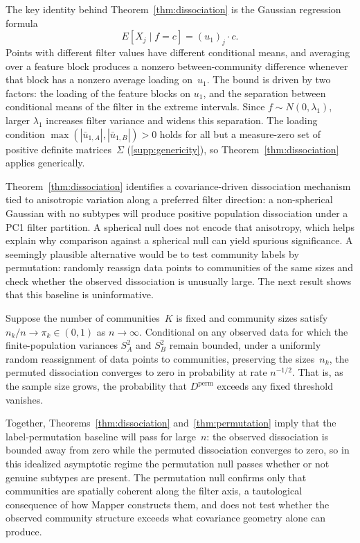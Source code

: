 \documentclass[hidelinks]{siamart251216}
\begin{document}
The key identity behind Theorem~\ref{thm:dissociation} is the
Gaussian regression formula
\begin{equation}\label{eq:gaussian-regression}
  E[X_j \mid f = c] = (u_1)_j \cdot c.
\end{equation}
Points with different filter values have different conditional means,
and averaging over a feature block produces a nonzero between-community
difference whenever that block has a nonzero average loading on~$u_1$.  The bound is driven by
two factors: the loading of the feature blocks on $u_1$, and the
separation between conditional means of the filter in the extreme
intervals.  Since $f \sim N(0, \lambda_1)$, larger $\lambda_1$ increases
filter variance and widens this separation.  The loading condition
$\max(|\bar{u}_{1,A}|, |\bar{u}_{1,B}|) > 0$ holds for all but a
measure-zero set of positive definite matrices~$\Sigma$
(\cref{supp:genericity}), so
Theorem~\ref{thm:dissociation} applies generically.

Theorem~\ref{thm:dissociation} identifies a covariance-driven
dissociation mechanism tied to anisotropic variation along a preferred
filter direction: a non-spherical Gaussian with no subtypes will
produce positive population dissociation under a PC1 filter partition.  A
spherical null does not encode that anisotropy, which helps explain why
comparison against a spherical null can yield spurious significance.
A seemingly plausible alternative would be to test community labels by
permutation: randomly reassign data points to communities of the same
sizes and check whether the observed dissociation is unusually large.
The next result shows that this baseline is uninformative.

\begin{theorem}\label{thm:permutation}
  Suppose the number of communities~$K$ is fixed and community sizes
  satisfy $n_k / n \to \pi_k \in (0,1)$ as $n \to \infty$.  Conditional on any observed
  data for which the finite-population variances $S_A^2$ and $S_B^2$
  remain bounded, under a uniformly random reassignment of data points
  to communities, preserving the sizes~$n_k$, the permuted dissociation
  converges to zero in probability at rate $n^{-1/2}$.
  That is, as the sample size grows, the probability that
  $D^{\mathrm{perm}}$ exceeds any fixed threshold vanishes.
\end{theorem}

Together, Theorems~\ref{thm:dissociation} and~\ref{thm:permutation}
imply that the label-permutation baseline will pass for large~$n$:
the observed dissociation is bounded away from zero while the permuted
dissociation converges to zero, so in this idealized asymptotic regime
the permutation null passes whether or not genuine subtypes are present.  The permutation null confirms only that communities are spatially
coherent along the filter axis, a tautological consequence of how
Mapper constructs them, and does not test whether the observed
community structure exceeds what covariance geometry alone can produce.
\end{document}
